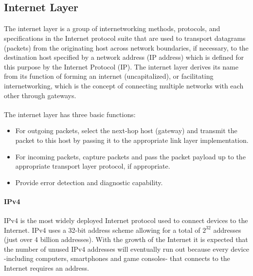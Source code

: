 \subsection{Internet Layer}
\paragraph{}
The internet layer is a group of internetworking methods, protocols, and specifications in the Internet protocol suite that are used to transport datagrams (packets) from the originating host across network boundaries, if necessary, to the destination host specified by a network address (IP address) which is defined for this purpose by the Internet Protocol (IP). The internet layer derives its name from its function of forming an internet (uncapitalized), or facilitating internetworking, which is the concept of connecting multiple networks with each other through gateways.
\paragraph{}
The internet layer has three basic functions:
\begin{itemize}
\item For outgoing packets, select the next-hop host (gateway) and transmit the packet to this host by passing it to the appropriate link layer implementation.
\item For incoming packets, capture packets and pass the packet payload up to the appropriate transport layer protocol, if appropriate.
\item Provide error detection and diagnostic capability.
\end{itemize}

\paragraph{} \textbf{IPv4}
\paragraph{}
IPv4 is the most widely deployed Internet protocol used to connect devices to the Internet. IPv4 uses a 32-bit address scheme allowing for a total of $ 2^{32} $ addresses (just over 4 billion addresses).  With the growth of the Internet it is expected that the number of unused IPv4 addresses will eventually run out because every device -including computers, smartphones and game consoles- that connects to the Internet requires an address.

